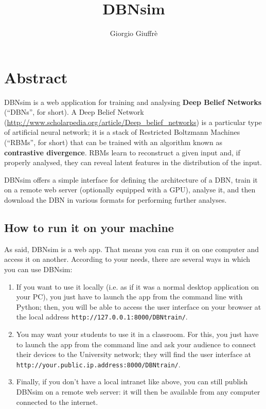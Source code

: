 \documentclass[a4paper]{article}
\title{DBNsim}
\author{Giorgio Giuffrè}
\date{}
\begin{document}
\maketitle
\tableofcontents
\newpage


\section{Abstract}

DBNsim is a web application for training and analysing \textbf{Deep Belief Networks} (``DBNs'', for short). A Deep Belief Network (\url{http://www.scholarpedia.org/article/Deep_belief_networks}) is a particular type of artificial neural network; it is a stack of Restricted Boltzmann Machines (``RBMs'', for short) that can be trained with an algorithm known as \textbf{contrastive divergence}. RBMs learn to reconstruct a given input and, if properly analysed, they can reveal latent features in the distribution of the input.

DBNsim offers a simple interface for defining the architecture of a DBN, train it on a remote web server (optionally equipped with a GPU), analyse it, and then download the DBN in various formats for performing further analyses.


\subsection{How to run it on your machine}

As said, DBNsim is a web app. That means you can run it on one computer and access it on another. According to your needs, there are several ways in which you can use DBNsim:
\begin{enumerate}
	\item If you want to use it locally (i.e. as if it was a normal desktop application on your PC), you just have to launch the app from the command line with Python; then, you will be able to access the user interface on your browser at the local address \texttt{http://127.0.0.1:8000/DBNtrain/}.
	\item You may want your students to use it in a classroom. For this, you just have to launch the app from the command line and ask your audience to connect their devices to the University network; they will find the user interface at \texttt{http://your.public.ip.address:8000/DBNtrain/}.
	\item Finally, if you don't have a local intranet like above, you can still publish DBNsim on a remote web server: it will then be available from any computer connected to the internet.
\end{enumerate}
\end{document}

